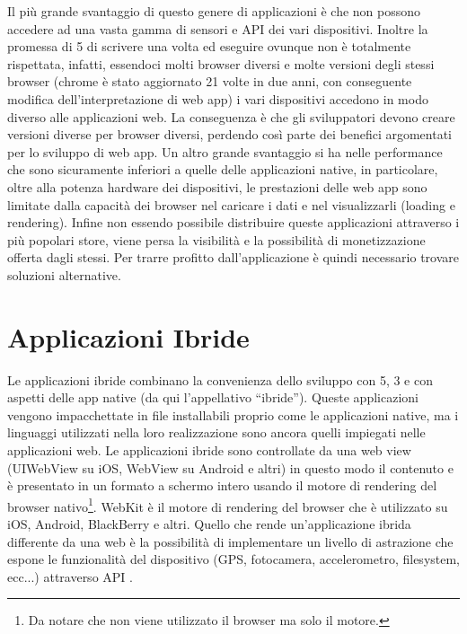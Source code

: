         Il più grande svantaggio di questo genere di applicazioni è che non
        possono accedere ad una vasta gamma di sensori e API dei vari
        dispositivi. Inoltre la promessa di \html{}5 di scrivere una volta ed eseguire
        ovunque non è totalmente rispettata, infatti, essendoci molti \mbox{browser}
        diversi e molte versioni degli stessi \mbox{browser} (chrome è stato aggiornato
        21 volte in due anni, con conseguente modifica dell'interpretazione di
        web app\citep{White:Native-vs-Html}) i vari dispositivi accedono in modo
        diverso alle applicazioni web. La conseguenza è che gli sviluppatori
        devono creare versioni diverse per \mbox{browser} diversi, perdendo così
        parte dei benefici argomentati per lo sviluppo di web app. Un
        altro grande svantaggio si ha nelle performance che sono sicuramente
        inferiori a quelle delle applicazioni native, in particolare, oltre
        alla potenza hardware dei dispositivi, le prestazioni delle web app
        sono limitate dalla capacità dei \mbox{browser} nel
        caricare i dati e nel visualizzarli (load\-ing e ren\-der\-ing). Infine non
        essendo possibile distribuire queste applicazioni attraverso i più
        popolari \mbox{store}, viene persa la visibilità e la possibilità di
        monetizzazione offerta dagli stessi. Per trarre profitto
        dall'applicazione è quindi necessario trovare soluzioni alternative.

    \section{Applicazioni Ibride}
        Le applicazioni ibride combinano la convenienza dello sviluppo con
        \html{}5,
        \css{}3 e \js{} con aspetti delle app native (da qui l'appellativo
        ``ibride''). Queste applicazioni vengono impacchettate in file
        installabili proprio come le applicazioni native, ma i linguaggi
        utilizzati nella loro realizzazione sono ancora quelli impiegati nelle
        applicazioni web. Le applicazioni ibride sono controllate da una web
        view (UIWebView su iOS, WebView su Android e altri) in questo modo il
        contenuto \js{} e \html{} è  presentato in un formato a schermo
        intero usando il motore di ren\-der\-ing del \mbox{browser} nativo\footnote{Da
        notare che non viene utilizzato il \mbox{browser} ma solo il motore.}. WebKit è
        il motore di ren\-der\-ing del \mbox{browser} che è utilizzato su iOS, Android,
        BlackBerry e altri. Quello che rende un'applicazione ibrida differente
        da una web è la possibilità di implementare un livello di astrazione
        che espone le funzionalità del dispositivo (GPS, fotocamera,
        accelerometro, filesys\-tem, ecc...) attraverso API \js{}.

